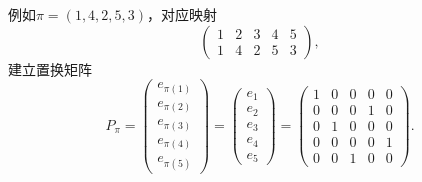 例如$\pi= (1,4,2,5,3)$，对应映射
\begin{equation*}
  \begin{pmatrix}
    1 & 2 & 3 & 4 & 5 \\
    1 & 4 & 2 & 5 & 3
  \end{pmatrix},
\end{equation*}
建立置换矩阵
\begin{equation*}
  P_{\pi} =
  \begin{pmatrix}
    e_{\pi(1)} \\
    e_{\pi(2)} \\
    e_{\pi(3)} \\
    e_{\pi(4)} \\
    e_{\pi(5)}
  \end{pmatrix}
  = \begin{pmatrix}
  e_{1} \\ e_{2} \\ e_{3} \\ e_{4} \\ e_{5}
  \end{pmatrix}
  = \begin{pmatrix}
  1 & 0 & 0 & 0 & 0 \\
  0 & 0 & 0 & 1 & 0 \\
  0 & 1 & 0 & 0 & 0 \\
  0 & 0 & 0 & 0 & 1 \\
  0 & 0 & 1 & 0 & 0
  \end{pmatrix}.
\end{equation*}

